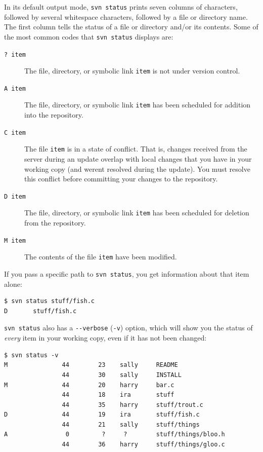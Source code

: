 In its default output mode, \texttt{svn\ status} prints seven columns of
characters, followed by several whitespace characters, followed by a
file or directory name. The first column tells the status of a file or
directory and/or its contents. Some of the most common codes that
\texttt{svn\ status} displays are:

\begin{description}
\item[\texttt{?\ item}]
The file, directory, or symbolic link \texttt{item} is not under version
control.
\item[\texttt{A\ item}]
The file, directory, or symbolic link \texttt{item} has been scheduled
for addition into the repository.
\item[\texttt{C\ item}]
The file \texttt{item} is in a state of conflict. That is, changes
received from the server during an update overlap with local changes
that you have in your working copy (and weren\textquotesingle t resolved
during the update). You must resolve this conflict before committing
your changes to the repository.
\item[\texttt{D\ item}]
The file, directory, or symbolic link \texttt{item} has been scheduled
for deletion from the repository.
\item[\texttt{M\ item}]
The contents of the file \texttt{item} have been modified.
\end{description}

If you pass a specific path to \texttt{svn\ status}, you get information
about that item alone:

\begin{verbatim}
$ svn status stuff/fish.c
D       stuff/fish.c
\end{verbatim}

\texttt{svn\ status} also has a \texttt{-\/-verbose} (\texttt{-v})
option, which will show you the status of \emph{every} item in your
working copy, even if it has not been changed:

\begin{verbatim}
$ svn status -v
M               44        23    sally     README
                44        30    sally     INSTALL
M               44        20    harry     bar.c
                44        18    ira       stuff
                44        35    harry     stuff/trout.c
D               44        19    ira       stuff/fish.c
                44        21    sally     stuff/things
A                0         ?     ?        stuff/things/bloo.h
                44        36    harry     stuff/things/gloo.c
\end{verbatim}

